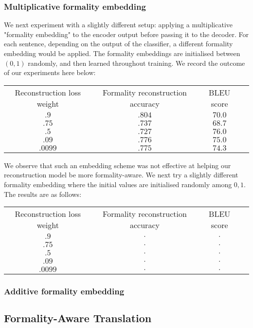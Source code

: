 \documentclass[11pt]{article}
\begin{document}
\subsubsection{Multiplicative formality embedding}

We next experiment with a slightly different setup: applying a multiplicative "formality embedding" to the encoder output before passing it to the decoder. For each sentence, depending on the output of the classifier, a different formality embedding would be applied. The formality embeddings are initialised between $(0, 1)$ randomly, and then learned throughout training. We record the outcome of our experiments here below:

\begin{tabular}{ c c c c }
    Reconstruction loss weight & Formality reconstruction accuracy & BLEU score \\
    $.9$ & $.804$ & $70.0$ \\
    $.75$ & $.737$ & $68.7$ \\
    $.5$ & $.727$ & $76.0$ \\
    $.09$ & $.776$ & $75.0$ \\
    $.0099$ & $.775$ & $74.3$ \\
\end{tabular}

We observe that such an embedding scheme was not effective at helping our reconstruction model be more formality-aware. We next try a slightly different formality embedding where the initial values are initialised randomly among ${0, 1}$. The results are as follows:

\begin{tabular}{ c c c c }
    Reconstruction loss weight & Formality reconstruction accuracy & BLEU score \\
    $.9$ & $.$ & $.$ \\
    $.75$ & $.$ & $.$ \\
    $.5$ & $.$ & $.$ \\
    $.09$ & $.$ & $.$ \\
    $.0099$ & $.$ & $.$ \\
\end{tabular}

\subsubsection{Additive formality embedding}

\subsection{Formality-Aware Translation}
\end{document}
